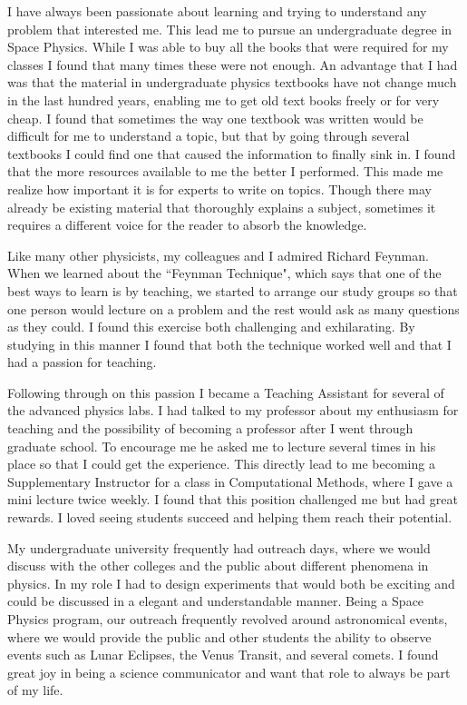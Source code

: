 \documentclass[12pt]{article}
\begin{document}
I have always been passionate about learning and trying to understand any
problem that interested me. This lead me to pursue an undergraduate degree in
Space Physics. While I was able to buy all the books that were required for my
classes I found that many times these were not enough. An advantage that I had
was that the material in undergraduate physics textbooks have not change much in
the last hundred years, enabling me to get old text books freely or for very
cheap. I found that sometimes the way one textbook was written would be
difficult for me to understand a topic, but that by going through several
textbooks I could find one that caused the information to finally sink in. I
found that the more resources available to me the better I performed. This made
me realize how important it is for experts to write on topics. Though there may
already be existing material that thoroughly explains a subject, sometimes it
requires a different voice for the reader to absorb the knowledge.

Like many other physicists, my colleagues and I admired Richard Feynman. When we
learned about the ``Feynman Technique", which says that one of the best ways to
learn is by teaching, we started to arrange our study groups so that one person
would lecture on a problem and the rest would ask as many questions as they
could. I found this exercise both challenging and exhilarating. By studying in
this manner I found that both the technique worked well and that I had a passion
for teaching. 

Following through on this passion I became a Teaching Assistant for several of
the advanced physics labs. I had talked to my professor about my enthusiasm for
teaching and the possibility of becoming a professor after I went through
graduate school. To encourage me he asked me to lecture several times in his
place so that I could get the experience. This directly lead to me becoming a
Supplementary Instructor for a class in Computational Methods, where I gave a
mini lecture twice weekly. I found that this position challenged me but had
great rewards. I loved seeing students succeed and helping them reach their
potential. 

My undergraduate university frequently had outreach days, where we would discuss
with the other colleges and the public about different phenomena in physics. In
my role I had to design experiments that would both be exciting and could be
discussed in a elegant and understandable manner. Being a Space Physics program,
our outreach frequently revolved around astronomical events, where we would
provide the public and other students the ability to observe events such as
Lunar Eclipses, the Venus Transit, and several comets. I found great joy in
being a science communicator and want that role to always be part of my life. 
\end{document}
